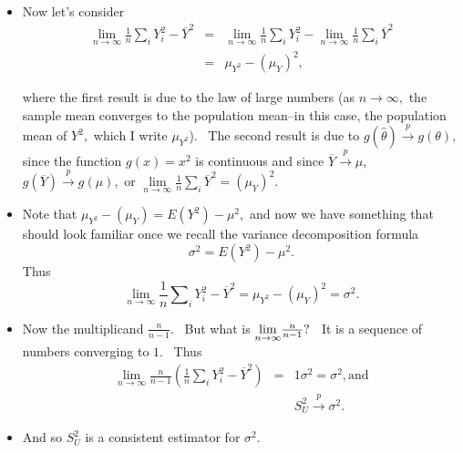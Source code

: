 \documentclass[11pt]{article}
\begin{document}
\begin{itemize}
\item Now let's consider%
\begin{eqnarray*}
\underset{n\rightarrow \infty }{\lim }\frac{1}{n}\sum\nolimits_{i}Y_{i}^{2}-%
\overline{Y}^{2} &=&\underset{n\rightarrow \infty }{\lim }\frac{1}{n}%
\sum\nolimits_{i}Y_{i}^{2}-\underset{n\rightarrow \infty }{\lim }\frac{1}{n}%
\sum\nolimits_{i}\overline{Y}^{2} \\
&=&\mu _{Y^{2}}-\left( \mu _{Y}\right) ^{2},
\end{eqnarray*}

where the first result is due to the law of large numbers (as $n\rightarrow
\infty ,$ the sample mean converges to the population mean--in this case,
the population mean of $Y^{2},$ which I write $\mu _{Y^{2}}$). \ The second
result is due to $g(\widehat{\theta })\overset{p}{\rightarrow }g(\theta ),$
since the function $g(x)=x^{2}$ is continuous and since $\overline{Y}\overset%
{p}{\rightarrow }\mu $, $g(\overline{Y})\overset{p}{\rightarrow }g(\mu ),$
or $\underset{n\rightarrow \infty }{\lim }\frac{1}{n}\sum\nolimits_{i}%
\overline{Y}^{2}=\left( \mu _{Y}\right) ^{2}.$

\item Note that $\mu _{Y^{2}}-\left( \mu _{Y}\right) =E(Y^{2})-\mu ^{2},$
and now we have something that should look familiar once we recall the
variance decomposition formula%
\begin{equation*}
\sigma ^{2}=E(Y^{2})-\mu ^{2}.
\end{equation*}%
Thus 
\begin{equation*}
\underset{n\rightarrow \infty }{\lim }\frac{1}{n}\sum\nolimits_{i}Y_{i}^{2}-%
\overline{Y}^{2}=\mu _{Y^{2}}-\left( \mu _{Y}\right) ^{2}=\sigma ^{2}.
\end{equation*}

\item Now the multiplicand $\frac{n}{n-1}.$ \ But what is $\underset{%
n\rightarrow \infty }{\lim }\frac{n}{n-1}?$ \ It is a sequence of numbers
converging to $1$. \ Thus 
\begin{eqnarray*}
\underset{n\rightarrow \infty }{\lim }\frac{n}{n-1}\left( \frac{1}{n}%
\sum\nolimits_{i}Y_{i}^{2}-\overline{Y}^{2}\right) &=&1\sigma ^{2}=\sigma
^{2},\text{and} \\
&&S_{U}^{2}\overset{p}{\rightarrow }\sigma ^{2}.
\end{eqnarray*}

\item And so $S_{U}^{2}$ is a consistent estimator for $\sigma ^{2}.$
\end{itemize}
\end{document}
